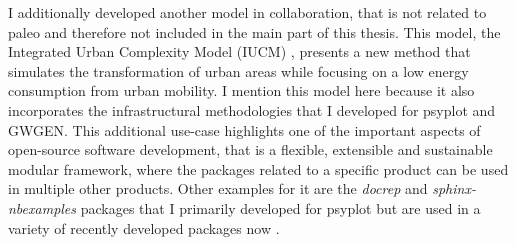 \begin{refsection}
I additionally developed another model in collaboration, that is not related to paleo and therefore not included in the main part of this thesis. This model, the Integrated Urban Complexity Model (IUCM) \citep{CremadesSommer2019}, presents a new method that simulates the transformation of urban areas while focusing on a low energy consumption from urban mobility. I mention this model here because it also incorporates the infrastructural methodologies that I developed for psyplot and GWGEN. This additional use-case highlights one of the important aspects of open-source software development, that is a flexible, extensible and sustainable modular framework, where the packages related to a specific product can be used in multiple other products. Other examples for it are the \textit{docrep} and \textit{sphinx-nbexamples} packages \citep[see also appendix \ref{chp:software}]{Sommer2018a, Sommer2018c} that I primarily developed for psyplot but are used in a variety of recently developed packages now \citep[e.g.][]{AbernatheyUchidaBuseckeEtAl2017, BanihirweLongAltuntasEtAl2019, Uchida2018}.

\printbibliography[heading=subbibintoc]

\end{refsection}